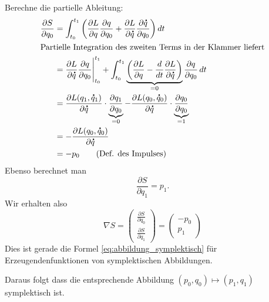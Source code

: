 \documentclass[german]{scrreprt}
\theoremstyle{plain}
\theoremstyle{nonumberplain}
\theoremstyle{nonumberplain}
\theoremstyle{nonumberplain}
\renewcommand*{\dot}[1]{\accentset{\mbox{\large\bfseries .}}{#1}}
\begin{document}
Berechne die partielle Ableitung:
\begin{align*}
\frac{\partial S}{\partial q_0}
& =
\int_{t_0}^{t_1} \bigg( \frac{\partial L}{\partial q} \frac{\partial q}{\partial q_0} + \frac{\partial L}{\partial \dot q}\frac{\partial\dot q}{\partial q_0}\bigg)\,dt \\
%
\intertext{Partielle Integration des zweiten Terms in der Klammer liefert}
&=
\frac{\partial L}{\partial \dot q}\frac{\partial q}{\partial q_0}\Bigg\vert_{t_0}^{t_1} + \int_{t_0}^{t_1} \underbrace{\bigg( \frac{\partial L}{\partial q}  - \frac{d}{dt} \frac{\partial L}{\partial \dot q}\bigg)}_{=0} \frac{\partial q}{\partial q_0}\,dt \\
&= \frac{\partial L(q_1,\dot q_1)}{\partial \dot q} \cdot \underbrace{\frac{\partial q_1}{\partial q_0}}_{=0}  - \frac{\partial L(q_0,\dot q_0)}{\partial \dot q} \cdot \underbrace{\frac{\partial q_0}{\partial q_0}}_{=1}  \\
&= - \frac{\partial L(q_0,\dot q_0)}{\partial \dot q} \\
&= -p_0 \tag{Def. des Impulses}
\end{align*}
Ebenso berechnet man
\begin{equation*}
\frac{\partial S}{\partial q_1} = p_1.
\end{equation*}
Wir erhalten also
\begin{equation}
\nabla S =
\begin{pmatrix}
\frac{\partial S}{\partial q_0}  \\
\frac{\partial S}{\partial q_1}
\end{pmatrix}
=
\begin{pmatrix}
-p_0 \\ p_1
\end{pmatrix}
\end{equation}
Dies ist gerade die Formel \eqref{eq:abbildung_symplektisch} für Erzeugendenfunktionen von symplektischen Abbildungen.

Daraus folgt dass die entsprechende Abbildung $(p_0,q_0) \mapsto (p_1,q_1)$ symplektisch ist.



\end{document}
